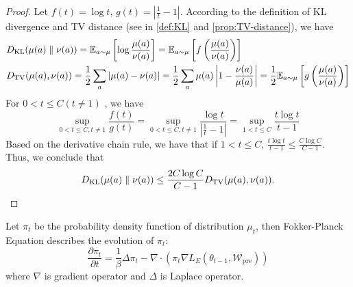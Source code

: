 \begin{proof}
	Let $f(t)=\log t$, $g(t)=|\frac{1}{t}-1|$. According to the definition of KL divergence and TV distance (see in \ref{def:KL} and \ref{prop:TV-distance}), we have
	$$
	\begin{aligned}
		&D_{\mathrm{KL}}(\mu(a) \parallel \nu(a)) = \mathbb{E}_{a \sim \mu}\left[\log \frac{\mu(a)}{\nu(a)}\right] = \mathbb{E}_{a \sim \mu}\left[f\left(\frac{\mu(a)}{\nu(a)}\right)\right] \\
		&D_{\mathrm{TV}}(\mu(a),\nu(a)) =\frac{1}{2}\sum_a |\mu(a)-\nu(a)| =\frac{1}{2}\sum_a \mu(a)\left|1-\frac{\nu(a)}{\mu(a)}\right| = \frac{1}{2}\mathbb{E}_{a \sim \mu}\left[g\left(\frac{\mu(a)}{\nu(a)}\right)\right] \\
	\end{aligned}
	$$ 
	For $0 < t \leq C (t \neq 1)$ , we have
	$$
	\sup_{0 < t \leq C, t \neq 1}\frac{f(t)}{g(t)} = \sup_{0< t \leq C, t \neq 1}\frac{\log t}{|\frac{1}{t}-1|} = \sup_{1< t \leq C}\frac{t\log t}{t-1}
	$$
	Based on the derivative chain rule, we have that if $1< t \leq C$, $\frac{t\log t}{t-1} \leq \frac{C\log C}{C-1}$.
	Thus, we conclude that
	$$
	D_{\mathrm{KL}}(\mu(a) \parallel \nu(a)) \leq \frac{2C\log C}{C-1}D_{\mathrm{TV}}(\mu(a),\nu(a)).
	$$
\end{proof}
\begin{definition}\label{def:Fokker} Let $\pi_t$ be the probability density function of distribution $\mu_t$, then Fokker-Planck Equation describes the evolution of $\pi_t$:
	$$\frac{\partial \pi_t}{\partial t}=\frac1\beta\Delta \pi_t-{\nabla}\cdot(\pi_t\nabla L_{E}(\theta_{t-1}, \mathcal{W}_{\text{pre}}) )$$
	where $\nabla$ is gradient operator and $\Delta$ is Laplace operator.
\end{definition}

